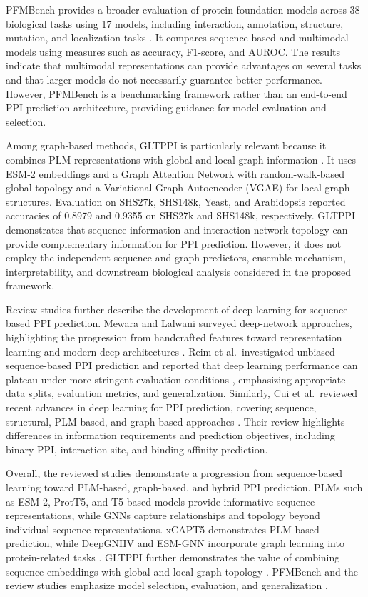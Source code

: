 \documentclass[conference]{IEEEtran}
\begin{document}
PFMBench provides a broader evaluation of protein foundation models across 38
biological tasks using 17 models, including interaction, annotation,
structure, mutation, and localization tasks \cite{b9}. It compares
sequence-based and multimodal models using measures such as accuracy,
F1-score, and AUROC. The results indicate that multimodal representations can
provide advantages on several tasks and that larger models do not necessarily
guarantee better performance. However, PFMBench is a benchmarking framework
rather than an end-to-end PPI prediction architecture, providing guidance for
model evaluation and selection.

Among graph-based methods, GLTPPI is particularly relevant because it combines
PLM representations with global and local graph information \cite{b10}. It uses
ESM-2 embeddings and a Graph Attention Network with random-walk-based global
topology and a Variational Graph Autoencoder (VGAE) for local graph
structures. Evaluation on SHS27k, SHS148k, Yeast, and Arabidopsis reported
accuracies of 0.8979 and 0.9355 on SHS27k and SHS148k, respectively. GLTPPI
demonstrates that sequence information and interaction-network topology can
provide complementary information for PPI prediction. However, it does not
employ the independent sequence and graph predictors, ensemble mechanism,
interpretability, and downstream biological analysis considered in the
proposed framework.

Review studies further describe the development of deep learning for
sequence-based PPI prediction. Mewara and Lalwani surveyed deep-network
approaches, highlighting the progression from handcrafted features toward
representation learning and modern deep architectures \cite{b11}. Reim et
al.\ investigated unbiased sequence-based PPI prediction and reported that deep
learning performance can plateau under more stringent evaluation conditions
\cite{b12}, emphasizing appropriate data splits, evaluation metrics, and
generalization. Similarly, Cui et al.\ reviewed recent advances in deep
learning for PPI prediction, covering sequence, structural, PLM-based, and
graph-based approaches \cite{b13}. Their review highlights differences in
information requirements and prediction objectives, including binary PPI,
interaction-site, and binding-affinity prediction.

Overall, the reviewed studies demonstrate a progression from sequence-based
learning toward PLM-based, graph-based, and hybrid PPI prediction. PLMs such as
ESM-2, ProtT5, and T5-based models provide informative sequence
representations, while GNNs capture relationships and topology beyond
individual sequence representations. xCAPT5 demonstrates PLM-based prediction,
while DeepGNHV and ESM-GNN incorporate graph learning into protein-related
tasks \cite{b5,b6,b8}. GLTPPI further demonstrates the value of combining
sequence embeddings with global and local graph topology \cite{b10}. PFMBench
and the review studies emphasize model selection, evaluation, and
generalization \cite{b9,b11,b12,b13}.
\end{document}
